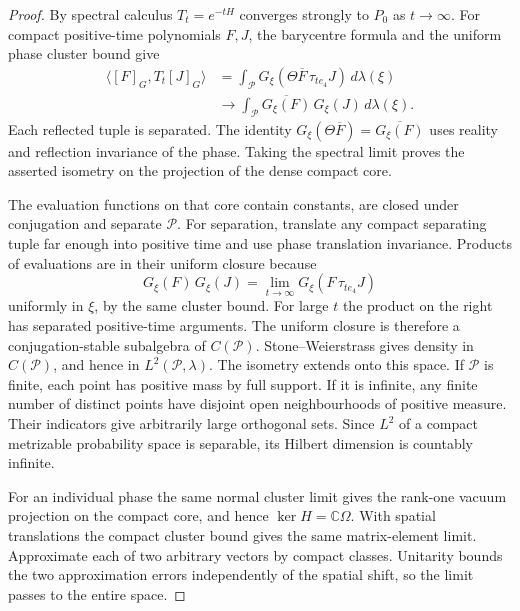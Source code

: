 \documentclass[11pt,letterpaper,reqno]{amsart}
\numberwithin{equation}{section}
\theoremstyle{definition}
\theoremstyle{remark}
\begin{document}
\begin{proof}
By spectral calculus \(T_t=e^{-tH}\) converges strongly
to \(P_0\) as \(t\to\infty\). For compact positive-time
polynomials \(F,J\), the barycentre formula and the
uniform phase cluster bound give
\[
 \begin{split}
 \langle[F]_G,T_t[J]_G\rangle
 &=\int_{\mathcal P}
   G_\xi(\Theta\overline F\,\tau_{te_4}J)\,d\lambda(\xi)\\
 &\longrightarrow\int_{\mathcal P}
             \overline{G_\xi(F)}\,G_\xi(J)\,d\lambda(\xi).
 \end{split}
\]
Each reflected tuple is separated. The identity
\(G_\xi(\Theta\overline F)=\overline{G_\xi(F)}\)
uses reality and reflection invariance of the phase.
Taking the spectral limit proves the asserted isometry
on the projection of the dense compact core.

The evaluation functions on that core contain constants,
are closed under conjugation and separate \(\mathcal P\).
For separation, translate any compact separating tuple
far enough into positive time and use phase translation
invariance. Products of evaluations are in their uniform
closure because
\[
 G_\xi(F)\,G_\xi(J)=
        \lim_{t\to\infty} G_\xi(F\,\tau_{te_4}J)
\]
uniformly in \(\xi\), by the same cluster bound.
For large \(t\) the product on the right has separated
positive-time arguments. The uniform closure is therefore
a conjugation-stable subalgebra of \(C(\mathcal P)\).
Stone--Weierstrass gives density in \(C(\mathcal P)\), and
hence in \(L^2(\mathcal P,\lambda)\). The isometry extends
onto this space. If \(\mathcal P\) is finite, each point has
positive mass by full support. If it is infinite, any finite
number of distinct points have disjoint open neighbourhoods
of positive measure. Their indicators give arbitrarily
large orthogonal sets. Since \(L^2\) of a compact metrizable
probability space is separable, its Hilbert dimension is
countably infinite.

For an individual phase the same normal cluster limit
gives the rank-one vacuum projection on the compact core,
and hence \(\ker H=\mathbb C\Omega\). With spatial
translations the compact cluster bound gives the same
matrix-element limit. Approximate each of two arbitrary
vectors by compact classes. Unitarity bounds the two
approximation errors independently of the spatial shift,
so the limit passes to the entire space.


\end{proof}
\end{document}
